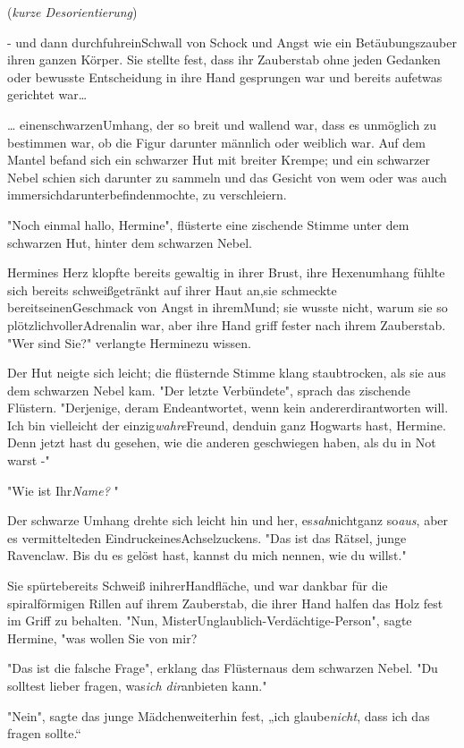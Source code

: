 {(\emph{kurze Desorientierung})

- und dann durchfuhreinSchwall von Schock und Angst wie ein Betäubungszauber ihren ganzen Körper. Sie stellte fest, dass ihr Zauberstab ohne jeden Gedanken oder bewusste Entscheidung in ihre Hand gesprungen war und bereits aufetwas gerichtet war…

… einenschwarzenUmhang, der so breit und wallend war, dass es unmöglich zu bestimmen war, ob die Figur darunter männlich oder weiblich war. Auf dem Mantel befand sich ein schwarzer Hut mit breiter Krempe; und ein schwarzer Nebel schien sich darunter zu sammeln und das Gesicht von wem oder was auch immersichdarunterbefindenmochte, zu verschleiern.

"Noch einmal hallo, Hermine", flüsterte eine zischende Stimme unter dem schwarzen Hut, hinter dem schwarzen Nebel.

Hermines Herz klopfte bereits gewaltig in ihrer Brust, ihre Hexenumhang fühlte sich bereits schweißgetränkt auf ihrer Haut an,sie schmeckte bereitseinenGeschmack von Angst in ihremMund; sie wusste nicht, warum sie so plötzlichvollerAdrenalin war, aber ihre Hand griff fester nach ihrem Zauberstab. "Wer sind Sie?" verlangte Herminezu wissen.

Der Hut neigte sich leicht; die flüsternde Stimme klang staubtrocken, als sie aus dem schwarzen Nebel kam. "Der letzte Verbündete", sprach das zischende Flüstern. "Derjenige, deram Endeantwortet, wenn kein andererdirantworten will. Ich bin vielleicht der einzig\emph{wahre}Freund, denduin ganz Hogwarts hast, Hermine. Denn jetzt hast du gesehen, wie die anderen geschwiegen haben, als du in Not warst -"

"Wie ist Ihr\emph{Name?} "

Der schwarze Umhang drehte sich leicht hin und her, es\emph{sah}nichtganz so\emph{aus}, aber es vermittelteden EindruckeinesAchselzuckens. "Das ist das Rätsel, junge Ravenclaw. Bis du es gelöst hast, kannst du mich nennen, wie du willst."

Sie spürtebereits Schweiß inihrerHandfläche, und war dankbar für die spiralförmigen Rillen auf ihrem Zauberstab, die ihrer Hand halfen das Holz fest im Griff zu behalten. "Nun, MisterUnglaublich-Verdächtige-Person", sagte Hermine, "was wollen Sie von mir?

"Das ist die falsche Frage", erklang das Flüsternaus dem schwarzen Nebel. "Du solltest lieber fragen, was\emph{ich dir}anbieten kann."

"Nein", sagte das junge Mädchenweiterhin fest, „ich glaube\emph{nicht}, dass ich das fragen sollte.“

}
